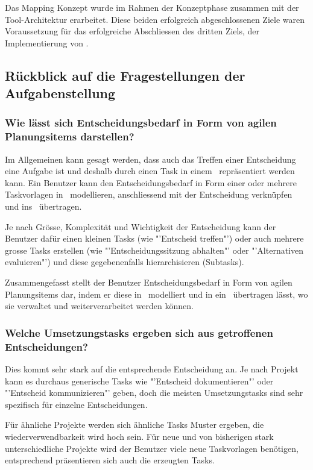 		Das Mapping Konzept wurde im Rahmen der Konzeptphase zusammen mit der Tool-Architektur erarbeitet. 
		Diese beiden erfolgreich abgeschlossenen Ziele waren Voraussetzung für das erfolgreiche Abschliessen des dritten Ziels, 
		der Implementierung von \eeppi.
				
		
	
	\subsection{Rückblick auf die Fragestellungen der Aufgabenstellung}
		\subsubsection{Wie lässt sich Entscheidungsbedarf in Form von agilen Planungsitems darstellen?}
			Im Allgemeinen kann gesagt werden,
			dass auch das Treffen einer Entscheidung eine Aufgabe ist
			und deshalb durch einen Task in einem \ppt\ repräsentiert werden kann.
			Ein Benutzer kann den Entscheidungsbedarf in Form einer oder mehrere Taskvorlagen in \eeppi\ modellieren,  
			anschliessend mit der Entscheidung verknüpfen und ins \ppt\ übertragen.
			
			Je nach Grösse, Komplexität und Wichtigkeit der Entscheidung kann der Benutzer dafür einen kleinen Tasks (wie "'Entscheid treffen"') oder auch mehrere grosse Tasks erstellen (wie "'Entscheidungssitzung abhalten"' oder "'Alternativen evaluieren"') und diese gegebenenfalls hierarchisieren (Subtasks).			
			
			Zusammengefasst stellt der Benutzer Entscheidungsbedarf in Form von agilen Planungsitems dar, indem er diese in \eeppi\ modelliert und in ein \ppt\ übertragen lässt, wo sie verwaltet und weiterverarbeitet werden können.


		\subsubsection{Welche Umsetzungstasks ergeben sich aus getroffenen Entscheidungen?}
			Dies kommt sehr stark auf die entsprechende Entscheidung an.
			Je nach Projekt kann es durchaus generische Tasks wie "'Entscheid dokumentieren"' oder "'Entscheid kommunizieren"' geben,
			doch die meisten Umsetzungstasks sind sehr spezifisch für einzelne Entscheidungen.
			
			Für ähnliche Projekte werden sich ähnliche Tasks Muster ergeben, die wiederverwendbarkeit wird hoch sein.
			Für neue und von bisherigen stark unterschiedliche Projekte wird der Benutzer viele neue Taskvorlagen benötigen, 
			entsprechend präsentieren sich auch die erzeugten Tasks.
			
